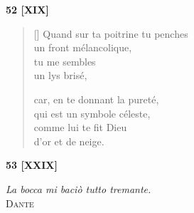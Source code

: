 \documentclass[a4paper,12pt]{book}
\begin{document}
\bigskip

\begin{center}
  \textbf{52 [XIX]}
\end{center}

\settowidth{\versewidth}{Quand sur ta poitrine tu penches}

\begin{verse}[\versewidth]
  Quand sur ta poitrine tu penches \\
  un front mélancolique, \\
  tu me sembles \\
  un lys brisé,

  car, en te donnant la pureté, \\
  qui est un symbole céleste, \\
  comme lui te fit Dieu \\
  d'or et de neige.
\end{verse}

\bigskip

\begin{center}
  \textbf{53 [XXIX]}
\end{center}

\settowidth{\versewidth}{Je sais seulement que nous nous tournâmes}

\begin{flushright}
  \emph{La bocca mi baciò tutto tremante.}\\ \textsc{Dante}
\end{flushright}
\end{document}
